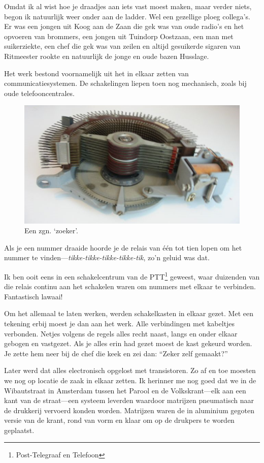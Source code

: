 \documentclass[10pt,twoside, openright]{memoir}
\begin{document}
Omdat ik al wist hoe je draadjes aan iets vast moest maken, maar verder niets, begon ik natuurlijk weer onder aan de ladder. Wel een gezellige ploeg collega’s. Er was een jongen uit Koog aan de Zaan die gek was van oude radio’s en het opvoeren van brommers, een jongen uit Tuindorp Oostzaan, een man met suikerziekte, een chef die gek was van zeilen en altijd gesuikerde sigaren van Ritmeester rookte en natuurlijk de jonge en oude bazen Husslage. 

Het werk bestond voornamelijk uit het in elkaar zetten van communicatiesystemen. De schakelingen liepen toen nog mechanisch, zoals bij oude telefooncentrales. 

\begin{figure}
\includegraphics[width=\textwidth]{img/ch32/image-4}
\caption*{\footnotesize Een zgn. ‘zoeker’.}
\end{figure}

Als je een nummer draaide hoorde je de relais van één tot tien lopen om het nummer te vinden---\emph{tikke-tikke-tikke-tikke-tik}, zo’n geluid was dat. 

Ik ben ooit eens in een schakelcentrum van de PTT\footnote{Post-Telegraaf en Telefoon} geweest, waar duizenden van die relais continu aan het schakelen waren om nummers met elkaar te verbinden. Fantastisch lawaai! 

Om het allemaal te laten werken, werden schakelkasten in elkaar gezet. Met een tekening erbij moest je dan aan het werk. Alle verbindingen met kabeltjes verbonden. Netjes volgens de regels alles recht naast, langs en onder elkaar gebogen en vastgezet. Als je alles erin had gezet moest de kast gekeurd worden. Je zette hem neer bij de chef die keek en zei dan: ``Zeker zelf gemaakt?''

Later werd dat alles electronisch opgelost met transistoren. Zo af en toe moesten we nog op locatie de zaak in elkaar zetten. Ik herinner me nog goed dat we in de Wibautstraat in Amsterdam tussen het Parool en de Volkskrant---elk aan een kant van de straat---een systeem leverden waardoor matrijzen pneumatisch naar de drukkerij vervoerd konden worden. Matrijzen waren de in aluminium gegoten versie van de krant, rond van vorm en klaar om op de drukpers te worden geplaatst. 
\end{document}
